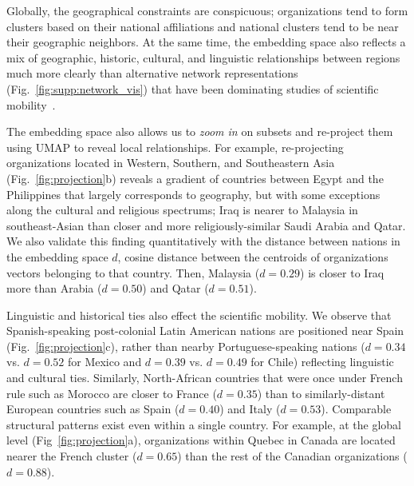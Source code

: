 \documentclass[12pt]{article} %
\begin{document}
Globally, the geographical constraints are conspicuous; organizations tend to form clusters based on their national affiliations and national clusters tend to be near their geographic neighbors.
At the same time, the embedding space also reflects a mix of geographic, historic, cultural, and linguistic relationships between regions much more clearly than alternative network representations (Fig.~\ref{fig:supp:network_vis}) that have been dominating studies of scientific mobility~\autocite{chinchilla2018global, czaika2018globalisation}.

The embedding space also allows us to \textit{zoom in} on subsets and re-project them using UMAP to reveal local relationships.
For example, re-projecting organizations located in Western, Southern, and Southeastern Asia (Fig.~\ref{fig:projection}b) reveals a gradient of countries between Egypt and the Philippines that largely corresponds to geography, but with some exceptions along the cultural and religious spectrums;
Iraq is nearer to Malaysia in southeast-Asian than closer and more religiously-similar Saudi Arabia and Qatar.
We also validate this finding quantitatively with the distance between nations  in the embedding space $d$,  cosine distance between the centroids of organizations vectors belonging to that country. 
Then, Malaysia ($d=0.29$) is closer to Iraq more than Arabia ($d=0.50$) and Qatar ($d=0.51$).

Linguistic and historical ties also effect the scientific mobility.
We observe that Spanish-speaking post-colonial Latin American nations are positioned near Spain (Fig.~\ref{fig:projection}c), rather than nearby Portuguese-speaking nations ($d = 0.34$ vs. $d = 0.52$ for Mexico and $d = 0.39$ vs. $d = 0.49$ for Chile) reflecting linguistic and cultural ties.
Similarly, North-African countries that were once under French rule such as Morocco are closer to France ($d =0.35$) than to similarly-distant European countries such as Spain ($d = 0.40$) and Italy ($d = 0.53$).
Comparable structural patterns exist even within a single country.
For example, at the global level (Fig~\ref{fig:projection}a), organizations within Quebec in Canada are located nearer the French cluster ($d = 0.65$) than the rest of the Canadian organizations ($d = 0.88$).
\end{document}
